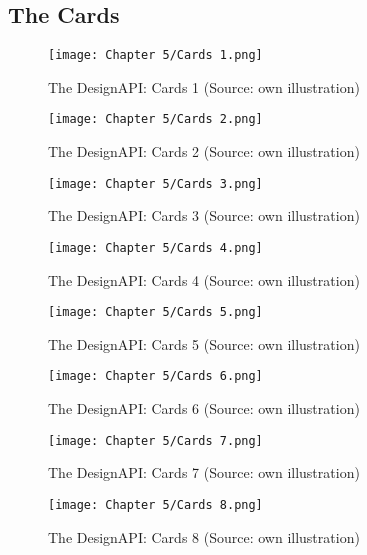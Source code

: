 \newpage
\subsection{The Cards}
\begin{figure}[H]
    \centering
    \texttt{[image: Chapter 5/Cards 1.png]}
    \caption{The DesignAPI: Cards 1 (Source: own illustration)}
\end{figure}

\begin{figure}[H]
    \centering
    \texttt{[image: Chapter 5/Cards 2.png]}
    \caption{The DesignAPI: Cards 2 (Source: own illustration)}
\end{figure}

\begin{figure}[H]
    \centering
    \texttt{[image: Chapter 5/Cards 3.png]}
    \caption{The DesignAPI: Cards 3 (Source: own illustration)}
\end{figure}

\begin{figure}[H]
    \centering
    \texttt{[image: Chapter 5/Cards 4.png]}
    \caption{The DesignAPI: Cards 4 (Source: own illustration)}
\end{figure}

\begin{figure}[H]
    \centering
    \texttt{[image: Chapter 5/Cards 5.png]}
    \caption{The DesignAPI: Cards 5 (Source: own illustration)}
\end{figure}

\begin{figure}[H]
    \centering
    \texttt{[image: Chapter 5/Cards 6.png]}
    \caption{The DesignAPI: Cards 6 (Source: own illustration)}
\end{figure}

\begin{figure}[H]
    \centering
    \texttt{[image: Chapter 5/Cards 7.png]}
    \caption{The DesignAPI: Cards 7 (Source: own illustration)}
\end{figure}

\begin{figure}[H]
    \centering
    \texttt{[image: Chapter 5/Cards 8.png]}
    \caption{The DesignAPI: Cards 8 (Source: own illustration)}
\end{figure}